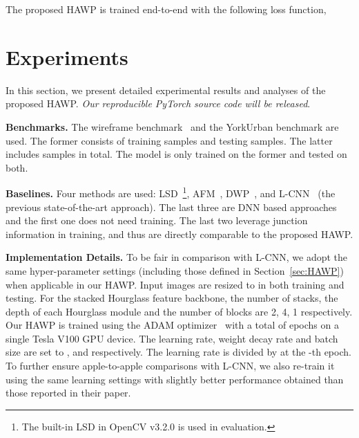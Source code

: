 \documentclass[10pt,twocolumn,letterpaper]{article}
\begin{document}
The proposed HAWP is trained end-to-end with the following loss function, 




\section{Experiments}\label{sec:exp}
\vspace{-2mm}
In this section, we present detailed experimental results and analyses of the proposed HAWP. \textit{Our reproducible PyTorch source code will be released}.


\textbf{Benchmarks.} The wireframe benchmark~\cite{Huang2018a} and the YorkUrban benchmark are used. The former consists of  training samples and  testing samples. The latter includes  samples in total. The model is only trained on the former and tested on both. 

\textbf{Baselines.} Four methods are used: LSD~\cite{VonGioi2010}\footnote{The built-in LSD in OpenCV v3.2.0 is used in evaluation.}, AFM~\cite{afm}, DWP~\cite{Huang2018a}, and L-CNN~\cite{ZhouQM19} (the previous state-of-the-art approach).  The last three are DNN based approaches and the first one does not need training. The last two leverage junction information in training, and thus are directly comparable to the proposed HAWP. 

\textbf{Implementation Details.} To be fair in comparison with L-CNN, we adopt the same hyper-parameter settings (including those defined in Section~\ref{sec:HAWP}) when applicable in our HAWP. Input images are resized to  in both training and testing. For the stacked Hourglass feature backbone, the number of stacks, the depth of each Hourglass module and the number of blocks are 2, 4, 1 respectively. Our HAWP is trained using the ADAM optimizer~\cite{adam} with a total of  epochs on a single Tesla V100 GPU device. The learning rate, weight decay rate and batch size are set to ,  and  respectively. The learning rate is divided by  at the -th epoch. To further ensure apple-to-apple comparisons with L-CNN, we also re-train it using the same learning settings with slightly better performance obtained than those reported in their paper. 
\end{document}
